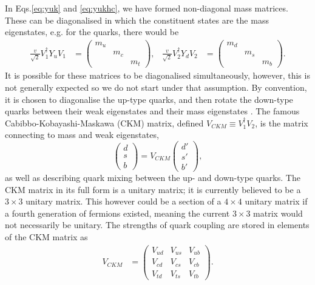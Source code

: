\documentclass[a4paper,12pt]{article}
\begin{document}
In Eqs.\eqref{eq:yuk} and \eqref{eq:yukhc}, we have formed non-diagonal mass matrices. 
These can be diagonalised in which the constituent states are the mass eigenstates, e.g. for the quarks, there would be 
\begin{align}
    \label{eq:massmat}
    \frac{v}{\sqrt{2}}V_1^\dagger Y_uV_1 &= \begin{pmatrix} m_u & & \\ & m_c & \\ & & m_t\end{pmatrix}, & \frac{v}{\sqrt{2}}V_2^\dagger Y_dV_2 &= \begin{pmatrix} m_d & & \\ & m_s & \\ & & m_b\end{pmatrix}.
\end{align}
It is possible for these matrices to be diagonalised simultaneously, however, this is not generally expected so we do not start under that assumption. 
By convention, it is chosen to diagonalise the up-type quarks, and then rotate the down-type quarks between their weak eigenstates and their mass eigenstates \cite{l}. 
The famous Cabibbo-Kobayashi-Maskawa (CKM) matrix, defined $V_{CKM}\equiv V_1^\dagger V_2$, is the matrix connecting to mass and weak eigenstates,
\begin{equation}
    \label{eq:ckmone}
    \begin{pmatrix} d \\ s \\ b\end{pmatrix} = V_{CKM}\begin{pmatrix} d' \\ s' \\ b'\end{pmatrix},
\end{equation}
as well as describing quark mixing between the up- and down-type quarks. 
The CKM matrix in its full form is a unitary matrix; it is currently believed to be a $3\times3$ unitary matrix. 
This however could be a section of a $4\times4$ unitary matrix if a fourth generation of fermions existed, meaning the current $3\times3$ matrix would not necessarily be unitary. 
The strengths of quark coupling are stored in elements of the CKM matrix as
\begin{align}
    \label{eq:ckmub}
    V_{CKM} &= \begin{pmatrix}V_{ud}&V_{us}&V_{ub}\\V_{cd}&V_{cs}&V_{cb}\\V_{td}&V_{ts}&V_{tb}\end{pmatrix}.
\end{align}
\end{document}
